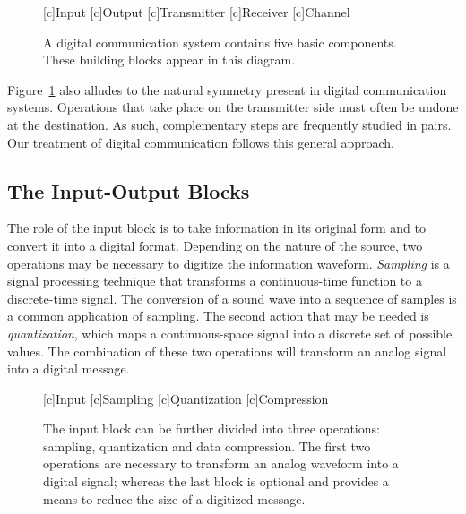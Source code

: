 \begin{figure}[htbp]
\begin{center}
\begin{psfrags}
[c]{Input}
[c]{Output}
[c]{Transmitter}
[c]{Receiver}
[c]{Channel}
\end{psfrags}
\end{center}
\caption{A digital communication system contains five basic components.
These building blocks appear in this diagram.}
\label{figure:BlockDiagram}
\end{figure}

Figure~\ref{figure:BlockDiagram} also alludes to the natural symmetry present in digital communication systems.
Operations that take place on the transmitter side must often be undone at the destination.
As such, complementary steps are frequently studied in pairs.
Our treatment of digital communication follows this general approach.


\subsection{The Input-Output Blocks}

The role of the input block is to take information in its original form and to convert it into a digital format.
Depending on the nature of the source, two operations may be necessary to digitize the information waveform.
\emph{Sampling} is a signal processing technique that transforms a continuous-time function to a discrete-time signal.
The conversion of a sound wave into a sequence of samples is a common application of sampling.
The second action that may be needed is \emph{quantization}, which maps a continuous-space signal into a discrete set of possible values.
The combination of these two operations will transform an analog signal into a digital message.

\begin{figure}[htbp]
\begin{center}
\begin{psfrags}
[c]{Input}
[c]{Sampling}
[c]{Quantization}
[c]{Compression}
\end{psfrags}
\end{center}
\caption{The input block can be further divided into three operations: sampling, quantization and data compression.
The first two operations are necessary to transform an analog waveform into a digital signal; whereas the last block is optional and provides a means to reduce the size of a digitized message.}
\label{figure:BlockInput}
\end{figure}

